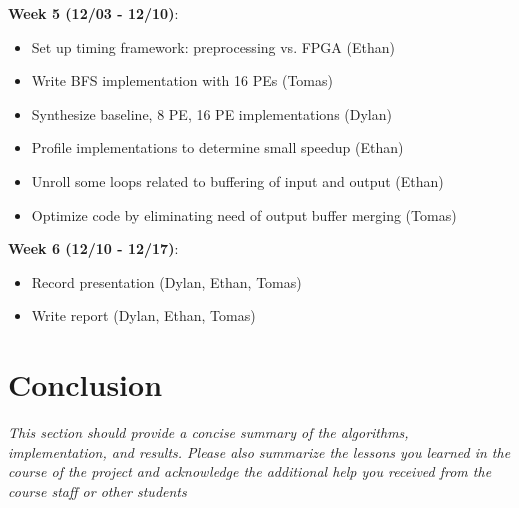 \documentclass[10pt]{article}
\begin{document}
\noindent \textbf{Week 5 (12/03 - 12/10)}:
\begin{itemize}
  \item Set up timing framework: preprocessing vs. FPGA (Ethan)
  \item Write BFS implementation with 16 PEs (Tomas)
  \item Synthesize baseline, 8 PE, 16 PE implementations (Dylan)
  \item Profile implementations to determine small speedup (Ethan)
  \item Unroll some loops related to buffering of input and output (Ethan)
  \item Optimize code by eliminating need of output buffer merging (Tomas)
\end{itemize}

\noindent \textbf{Week 6 (12/10 - 12/17)}:
\begin{itemize}
  \item Record presentation (Dylan, Ethan, Tomas)
  \item Write report (Dylan, Ethan, Tomas)
\end{itemize}

\section{Conclusion}

\textit{This section should provide a concise summary of the algorithms, implementation, and results. Please also summarize the lessons you learned in the course of
the project and acknowledge the additional help you received from the course staff or other students}
\end{document}
